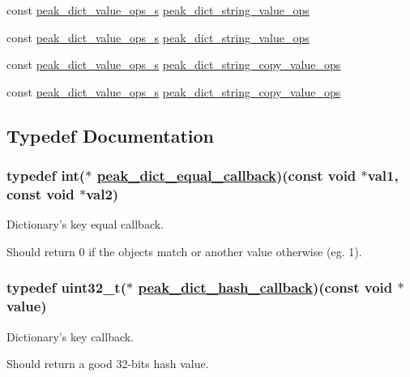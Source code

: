 \begin{CompactItemize}
\item 
const \hyperlink{structpeak__dict__value__ops__s}{peak\_\-dict\_\-value\_\-ops\_\-s} \hyperlink{group__dict_ga17}{peak\_\-dict\_\-string\_\-value\_\-ops}
\item 
const \hyperlink{structpeak__dict__value__ops__s}{peak\_\-dict\_\-value\_\-ops\_\-s} \hyperlink{group__dict_ga18}{peak\_\-dict\_\-string\_\-value\_\-ops}
\item 
const \hyperlink{structpeak__dict__value__ops__s}{peak\_\-dict\_\-value\_\-ops\_\-s} \hyperlink{group__dict_ga19}{peak\_\-dict\_\-string\_\-copy\_\-value\_\-ops}
\item 
const \hyperlink{structpeak__dict__value__ops__s}{peak\_\-dict\_\-value\_\-ops\_\-s} \hyperlink{group__dict_ga20}{peak\_\-dict\_\-string\_\-copy\_\-value\_\-ops}
\end{CompactItemize}


\subsection{Typedef Documentation}
\hypertarget{group__dict_ga3}{
\subsubsection[peak\_\-dict\_\-equal\_\-callback]{\setlength{\rightskip}{0pt plus 5cm}typedef int($\ast$ \hyperlink{group__dict_ga3}{peak\_\-dict\_\-equal\_\-callback})(const void $\ast$val1, const void $\ast$val2)}}
\label{group__dict_ga3}


Dictionary's key equal callback. 

Should return 0 if the objects match or another value otherwise (eg. 1). \hypertarget{group__dict_ga4}{
\subsubsection[peak\_\-dict\_\-hash\_\-callback]{\setlength{\rightskip}{0pt plus 5cm}typedef uint32\_\-t($\ast$ \hyperlink{group__dict_ga4}{peak\_\-dict\_\-hash\_\-callback})(const void $\ast$value)}}
\label{group__dict_ga4}


Dictionary's key callback. 

Should return a good 32-bits hash value. 

